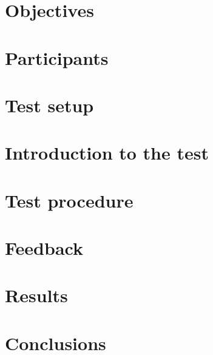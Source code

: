 \section{Objectives}
\section{Participants}
\section{Test setup}
\section{Introduction to the test}
\section{Test procedure}
\section{Feedback}
\section{Results}
\section{Conclusions}